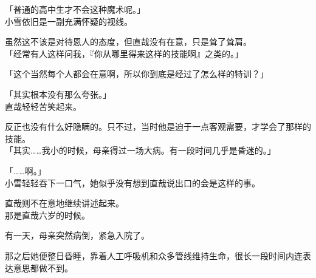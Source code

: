 「普通的高中生才不会这种魔术呢。」\\

小雪依旧是一副充满怀疑的视线。

虽然这不该是对待恩人的态度，但直哉没有在意，只是耸了耸肩。\\

「经常有人这样问我，『你从哪里得来这样的技能啊』之类的。」

「这个当然每个人都会在意啊，所以你到底是经过了怎么样的特训？」

「其实根本没有那么夸张。」\\

直哉轻轻苦笑起来。

反正也没有什么好隐瞒的。只不过，当时他是迫于一点客观需要，才学会了那样的技能。\\

「其实……我小的时候，母亲得过一场大病。有一段时间几乎是昏迷的。」

「……啊。」\\

小雪轻轻吞下一口气，她似乎没有想到直哉说出口的会是这样的事。

直哉则不在意地继续讲述起来。\\

那是直哉六岁的时候。

有一天，母亲突然病倒，紧急入院了。

那之后她便整日昏睡，靠着人工呼吸机和众多管线维持生命，很长一段时间内连表达意思都做不到。\\

